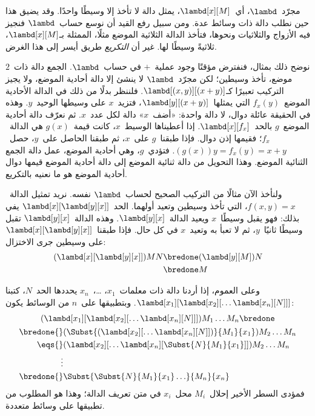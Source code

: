 \documentclass[../../../include/open-logic-section]{subfiles}
\begin{document}

مجرّد~$\lambd$، أي~$\lambd[x][M]$، يمثل دالة لا تأخذ إلا وسيطًا
واحدًا. وقد يضيق هذا حين نطلب دالة ذات وسائط عدة.
ومن سبيل رفع القيد أن نوسع حساب~$\lambd$ فنجيز فيه
الأزواج والثلاثيات ونحوها، فتأخذ الدالة الثلاثية الموضع مثلًا،
الممثلة بـ$\lambd[x][M]$، ثلاثيةً وسيطًا لها.
غير أن \emph{التكريع} طريق أيسر إلى هذا الغرض.

نوضح ذلك بمثال، فنفترض مؤقتًا وجود عملية~$+$ في
حساب~$\lambd$. الجمع دالة ذات~$2$ موضع، تأخذ وسيطين؛
لكن مجرّد~$\lambd$ لا ينشئ إلا دالة أحادية الموضع،
ولا يجيز التركيب تعبيرًا كـ$\lambd[(x,y)][(x+y)]$.
فلننظر بدلًا من ذلك في الدالة الأحادية الموضع~$f_x(y)$
التي يمثلها~$\lambd[y][(x+y)]$، فتزيد~$x$ على وسيطها
الوحيد~$y$. وهذه في الحقيقة عائلة دوال، لا دالة واحدة:
«أضف~$x$» دالة لكل عدد~$x$.
ثم نعرّف دالة أحادية الموضع~$g$ بالحد~$\lambd[x][f_x]$.
إذا أعطيناها الوسيط~$x$، كانت قيمة~$g(x)$ هي الدالة~$f_x$؛
فقيمها إذن دوال. فإذا طبقنا~$g$ على~$x$،
ثم طبقنا الحاصل على~$y$، حصل~$(g(x))y = f_x(y) = x+y$.
فتؤدي~$g$، وهي أحادية الموضع، عمل دالة الجمع الثنائية الموضع.
وهذا التحويل من دالة ثنائية الموضع إلى دالة أحادية الموضع
قيمها دوال أحادية الموضع هو ما نعنيه بالتكريع.

ولنأخذ الآن مثالًا من التركيب الصحيح لحساب~$\lambd$ نفسه.
نريد تمثيل الدالة~$f(x,y) = x$، التي تأخذ وسيطين وتعيد
أولهما. الحد~$\lambd[x][\lambd[y][x]]$ يفي بذلك:
فهو يقبل وسيطًا~$x$ ويعيد الدالة~$\lambd[y][x]$.
وهذه الدالة~$\lambd[y][x]$ تقبل وسيطًا ثانيًا~$y$،
ثم لا تعبأ به وتعيد~$x$ في كل حال.
فإذا طبقنا~$\lambd[x][\lambd[y][x]]$ على وسيطين جرى الاختزال:
\begin{align*}
  (\lambd[x][\lambd[y][x]])MN 
  \bredone & (\lambd[y][M])N \\
  \bredone & M
\end{align*}

وعلى العموم، إذا أردنا دالة ذات معلمات~$x_1$، \dots،~$x_n$
يحددها الحد~$N$، كتبنا
$\lambd[x_1][\lambd[x_2][\ldots\lambd[x_n][N]]]$.
وبتطبيقها على~$n$ من الوسائط يكون:
\begin{multline*}
  (\lambd[x_1][\lambd[x_2][\ldots\lambd[x_n][N]]]) M_1 \dots M_n \bredone\\
  \begin{aligned}
  \bredone {} & (\Subst{(\lambd[x_2][\ldots\lambd[x_n][N]])}{M_1}{x_1}) M_2
  \dots M_n\\
   \eqs {} & (\lambd[x_2][\ldots\lambd[x_n][\Subst{N}{M_1}{x_1}]]) M_2
            \dots M_n \\
  \vdots & \\
  \bredone {} &\Subst{\Subst{N}{M_1}{x_1}\ldots}{M_n}{x_n}
  \end{aligned}
\end{multline*}
فمؤدى السطر الأخير إحلال~$M_i$ محل~$x_i$ في متن تعريف
الدالة؛ وهذا هو المطلوب من تطبيقها على وسائط متعددة.
\end{document}
